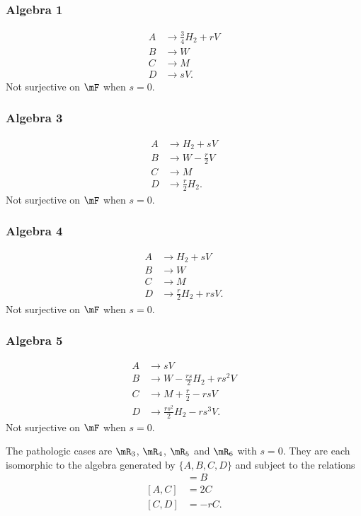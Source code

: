 \subsubsection{Algebra 1}

\begin{align*}
A&\to \frac{ 3 }{4}H_{2}+rV\\
B&\to W\\
C&\to M\\
D&\to sV.
\end{align*}
Not surjective on $\mF$ when $s=0$.

\subsubsection{Algebra 3}

\begin{align*}
A&\to H_{2}+sV\\
B&\to W-\frac{ r }{ 2 }V\\
C&\to M\\
D&\to \frac{ r }{ 2 }H_{2}.
\end{align*}
Not surjective on $\mF$ when $s=0$.

\subsubsection{Algebra 4}

\begin{align*}
A&\to H_{2}+sV\\
B&\to W\\
C&\to M\\
D&\to \frac{ r }{ 2 }H_{2}+rsV.
\end{align*}
Not surjective on $\mF$ when $s=0$.

\subsubsection{Algebra 5}

\begin{align*}
A&\to sV\\
B&\to W-\frac{ rs }{ 2 }H_{2}+rs^{2}V\\
C&\to M+\frac{ r }{2}-rsV\\
D&\to \frac{ rs^{2} }{ 2 }H_{2}-rs^{3}V.
\end{align*}
Not surjective on $\mF$ when $s=0$.

The pathologic cases are $\mR_{3}$, $\mR_{4}$, $\mR_{5}$ and $\mR_{6}$ with $s=0$.  They are each isomorphic to the algebra generated by $\{ A,B,C,D \}$ and subject to the relations
\begin{align*}
[A,B]&=B\\
[A,C]&=2C\\
[C,D]&=-rC.
\end{align*}



